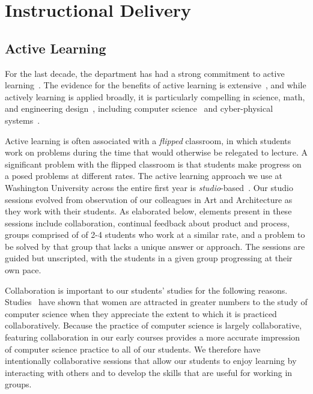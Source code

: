 \section{Instructional Delivery}
\label{sec:delivery}

\subsection{Active Learning}

For the last decade, the department has had a strong commitment to
active learning~\cite{scbggg10,sgcggt10}.
The evidence for the benefits of active learning is
extensive~\cite{jjs98,lst99,Prince04,rss97},
and while actively learning is applied broadly, it is particularly
compelling in science, math, and engineering
design~\cite{Freeman14,lst99,Hake98,Byerley01,kb06}, including computer
science~\cite{McConnell96,tlb01,skltc10,ag13}
and cyber-physical systems~\cite{me14,mmy16}.

Active learning is often associated with a \emph{flipped} classroom, in
which students work on problems during the time that would otherwise be
relegated to lecture.  A significant problem with the flipped classroom is
that students make progress on a posed problems at different
rates.
The active learning approach we use at Washington University across the entire
first year is \emph{studio}-based~\cite{hnc08}.
Our studio sessions evolved from observation of our colleagues in
Art and Architecture as they work with their students.  As elaborated below,
elements present in
these sessions include collaboration, continual feedback about product
and process, groups comprised of of 2-4 students who work at a similar rate, 
and a problem to be solved by that group that lacks a unique
answer or approach.  The sessions are guided but unscripted, with the
students in a given group progressing at their own pace.

Collaboration is important to our students' studies for the following reasons.
Studies~\cite{Krause:2012:EFL:2157136.2157192} have shown that women are
attracted in greater numbers to the study of computer science when they
appreciate the extent to which it is practiced collaboratively.  Because
the practice of computer science is largely collaborative, featuring collaboration
in our early courses provides a more accurate impression of computer science
practice to all of our students.  We therefore have intentionally collaborative
sessions that allow our students to enjoy learning by interacting with others
and to develop the skills that are useful for working in groups.

